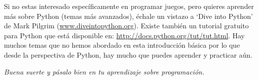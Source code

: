Si no estas interesado específicamente en programar juegos, pero quieres aprender más sobre Python (temas más avanzados), échale un vistazo a `Dive into Python' de Mark Pilgrim (\href{http://www.diveintopython.org}{www.diveintopython.org}).  Existe también un tutorial gratuito para Python que está disponible en: \href{http://docs.python.org/tut/tut.html}{http://docs.python.org/tut/tut.html}.  Hay muchos temas que no hemos abordado en esta introducción básica por lo que desde la perspectiva de Python, hay mucho que puedes aprender y practicar aún.
\par\par\noindent
\emph{Buena suerte y pásalo bien en tu aprendizaje sobre programación.}

\newpage
